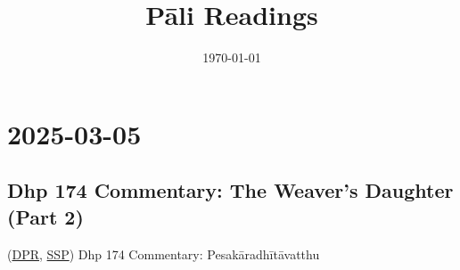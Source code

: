 \documentclass[11pt,oneside]{memoir}
\date{\today}
\title{Pāli Readings}
\begin{document}
\maketitle

\chapter{2025-03-05}
\label{sec:orgf7bb49e}
\section{Dhp 174 Commentary: The Weaver's Daughter (Part 2)}
\label{sec:org6f36ffc}

(\href{https://www.digitalpalireader.online/\_dprhtml/index.html?loc=k.1.0.1.4.6.x.a}{DPR}, \href{http://localhost:4848/suttas/s0502a.att/pli/cst4?quote=andhabh\%25C5\%25ABtoti\%2520ima\%25E1\%25B9\%2581\%2520dhammadesana\%25E1\%25B9\%2581\&window\_type=Sutta+Study}{SSP}) Dhp 174 Commentary: Pesakāradhītāvatthu
\end{document}

